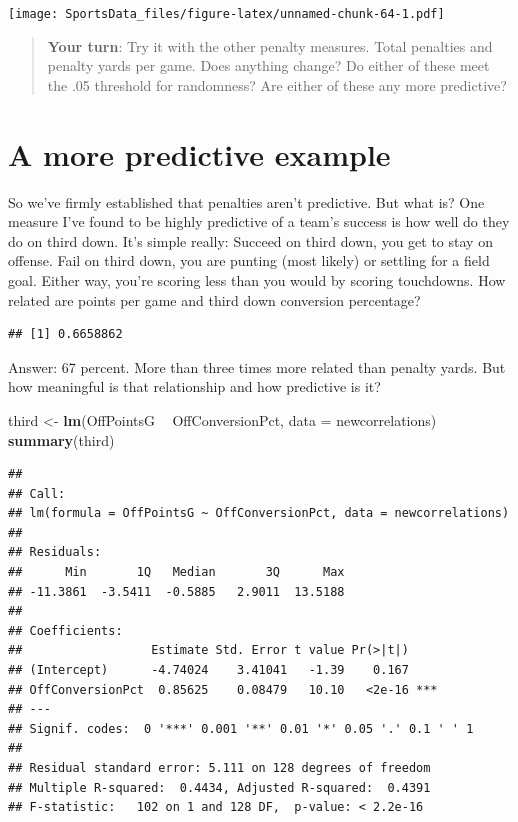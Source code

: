 \documentclass[]{book}
\newenvironment{Shaded}{\begin{snugshade}}{\end{snugshade}}
\newcommand{\KeywordTok}[1]{\textcolor[rgb]{0.13,0.29,0.53}{\textbf{#1}}}
\newcommand{\DataTypeTok}[1]{\textcolor[rgb]{0.13,0.29,0.53}{#1}}
\newcommand{\StringTok}[1]{\textcolor[rgb]{0.31,0.60,0.02}{#1}}
\newcommand{\OperatorTok}[1]{\textcolor[rgb]{0.81,0.36,0.00}{\textbf{#1}}}
\newcommand{\NormalTok}[1]{#1}
\begin{document}
\texttt{[image: SportsData\_files/figure-latex/unnamed-chunk-64-1.pdf]}

\begin{quote}
\textbf{Your turn}: Try it with the other penalty measures. Total
penalties and penalty yards per game. Does anything change? Do either of
these meet the .05 threshold for randomness? Are either of these any
more predictive?
\end{quote}

\section{A more predictive example}\label{a-more-predictive-example}

So we've firmly established that penalties aren't predictive. But what
is? One measure I've found to be highly predictive of a team's success
is how well do they do on third down. It's simple really: Succeed on
third down, you get to stay on offense. Fail on third down, you are
punting (most likely) or settling for a field goal. Either way, you're
scoring less than you would by scoring touchdowns. How related are
points per game and third down conversion percentage?

\begin{Shaded}
\end{Shaded}

\begin{verbatim}
## [1] 0.6658862
\end{verbatim}

Answer: 67 percent. More than three times more related than penalty
yards. But how meaningful is that relationship and how predictive is it?

\begin{Shaded}
\begin{Highlighting}[]
\NormalTok{third <-}\StringTok{ }\KeywordTok{lm}\NormalTok{(OffPointsG }\OperatorTok{~}\StringTok{ }\NormalTok{OffConversionPct, }\DataTypeTok{data =}\NormalTok{ newcorrelations)}
\KeywordTok{summary}\NormalTok{(third)}
\end{Highlighting}
\end{Shaded}

\begin{verbatim}
## 
## Call:
## lm(formula = OffPointsG ~ OffConversionPct, data = newcorrelations)
## 
## Residuals:
##      Min       1Q   Median       3Q      Max 
## -11.3861  -3.5411  -0.5885   2.9011  13.5188 
## 
## Coefficients:
##                  Estimate Std. Error t value Pr(>|t|)    
## (Intercept)      -4.74024    3.41041   -1.39    0.167    
## OffConversionPct  0.85625    0.08479   10.10   <2e-16 ***
## ---
## Signif. codes:  0 '***' 0.001 '**' 0.01 '*' 0.05 '.' 0.1 ' ' 1
## 
## Residual standard error: 5.111 on 128 degrees of freedom
## Multiple R-squared:  0.4434, Adjusted R-squared:  0.4391 
## F-statistic:   102 on 1 and 128 DF,  p-value: < 2.2e-16
\end{verbatim}
\end{document}
